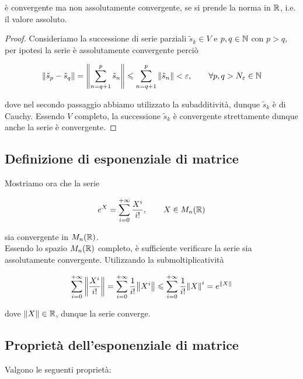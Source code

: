 è convergente ma non assolutamente convergente, se si prende la norma in $ \mathbb{R} $, i.e. il valore assoluto.

\begin{proof}
	Consideriamo la successione di serie parziali $ \tilde{s}_{k} \in V $ e $ p,q \in \mathbb{N} $ con $ p > q $, per ipotesi la serie è assolutamente convergente perciò
	
	\begin{equation}
		\norm{\tilde{s}_{p} - \tilde{s}_{q}} = \norm{ \sum_{n=q+1}^{p} \tilde{s}_{n} } \leqslant \sum_{n=q+1}^{p} \norm{\tilde{s}_{n}} < \varepsilon, \qquad \forall p,q > N_{\varepsilon} \in \mathbb{N}
	\end{equation}

	dove nel secondo passaggio abbiamo utilizzato la subadditività, dunque $ \tilde{s}_{k} $ è di Cauchy. Essendo $ V $ completo, la successione $ \tilde{s}_{k} $ è convergente strettamente dunque anche la serie è convergente.
\end{proof}

\subsection{Definizione di esponenziale di matrice}

Mostriamo ora che la serie

\begin{equation}
	e^{X} = \sum_{i=0}^{+\infty} \dfrac{X^{i}}{i!}, \qquad X \in M_{n}(\mathbb{R})
\end{equation}

sia convergente in $ M_{n}(\mathbb{R}) $.\\
Essendo lo spazio $ M_{n}(\mathbb{R}) $ completo, è sufficiente verificare la serie sia assolutamente convergente. Utilizzando la submoltiplicatività

\begin{equation}
	\sum_{i=0}^{+\infty} \norm{ \dfrac{X^{i}}{i!} } = %
	\sum_{i=0}^{+\infty} \dfrac{1}{i!} \norm{X^{i}} \leqslant %
	\sum_{i=0}^{+\infty} \dfrac{1}{i!} \norm{X}^{i} = %
	e^{\norm{X}}
\end{equation}

dove $ \norm{X} \in \mathbb{R} $, dunque la serie converge.

\subsection{Proprietà dell'esponenziale di matrice}

Valgono le seguenti proprietà:

